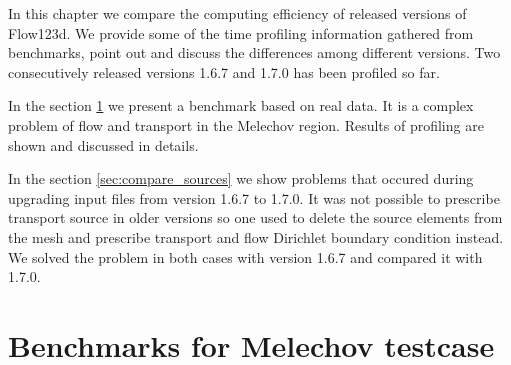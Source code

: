 %
%
%
%
%
%
%
%


In this chapter we compare the computing efficiency of released versions of Flow123d. We provide 
some of the time profiling information gathered from benchmarks, point out and discuss the differences 
among different versions. Two consecutively released versions 1.6.7 and 1.7.0 has been profiled so far.

In the section \ref{sec:compare_mel} we present a benchmark based on real data. It is a complex 
problem of flow and transport in the Melechov region. Results of profiling are shown and discussed 
in details.

In the section \ref{sec:compare_sources} we show problems that occured during upgrading input files from
version 1.6.7 to 1.7.0. It was not possible to prescribe transport source in older versions
so one used to delete the source elements from the mesh and prescribe transport and flow Dirichlet boundary condition instead.
We solved the problem in both cases with version 1.6.7 and compared it with 1.7.0.



\section{Benchmarks for Melechov testcase}
\label{sec:compare_mel}


